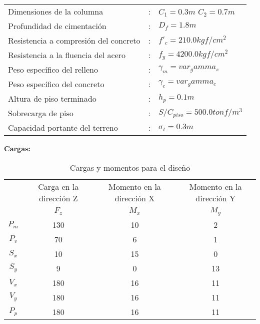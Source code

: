 \documentclass{article}%
\begin{document}
\begin{table}[h!]
    \centering
    \begin{tabular}{lcl} %
        Dimensiones de la columna               &:& $C_1        = 0.3 m$ \quad $C_2 = 0.7 m$\\
        Profundidad de cimentación              &:& $D_f        = 1.8 m$\\
        Resistencia a compresión del concreto   &:& $f'_c       =  210.0 kgf/cm^2 $ \\
        Resistencia a la fluencia del acero     &:& $f_y        =  4200.0 kgf/cm^2$ \\
        Peso específico del relleno             &:& $\gamma_m   =  var_gamma_s $ \\
        Peso específico del concreto            &:& $\gamma_c   =  var_gamma_c $ \\
        Altura de piso terminado                &:& $h_p        = 0.1 m$\\
        Sobrecarga de piso                      &:& $S/C_{piso} = 500.0 tonf/m^3$ \\ 
        Capacidad portante del terreno          &:& $\sigma_t  = 0.3 m$  \\
    \end{tabular}
\end{table}

\textbf{Cargas:}


\begin{table}[h!]
    \centering
    \begin{tabular}{cccc} \toprule
         & Carga en la dirección Z & Momento en la dirección X & Momento en la dirección Y  \\ 
         & $F_z$ & $M_x $ & $M_y$ \\ \midrule
        $P_m$ & 130& 10 & 2 \\
        $P_v$ & 70 & 6 & 1 \\
        $S_x$ & 10 & 15 & 0 \\
        $S_y$ & 9 & 0 & 13 \\
        $V_x$ & 180 & 16 & 11 \\
        $V_y$ & 180 & 16 & 11 \\
        $P_p$ & 180 & 16 & 11 \\\bottomrule
    \end{tabular}
    \caption{Cargas y momentos para el diseño}
    \label{tab:my_label}
\end{table}
\end{document}
